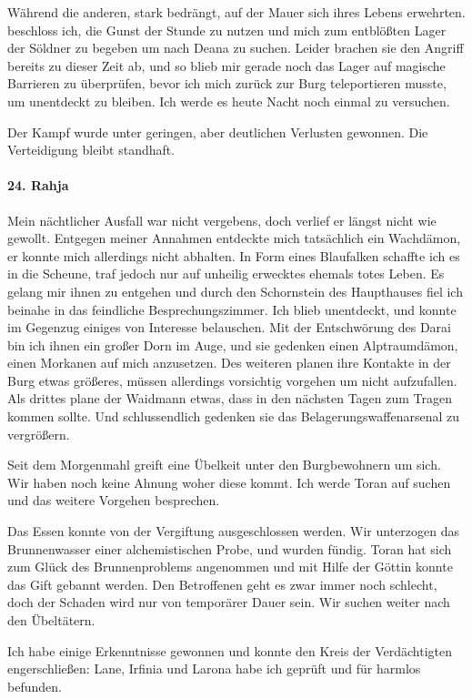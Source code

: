 Während die anderen, stark bedrängt, auf der Mauer sich ihres Lebens erwehrten. beschloss ich, die Gunst der Stunde zu nutzen und mich zum entblößten Lager der Söldner zu begeben um nach Deana zu suchen. Leider brachen sie den Angriff bereits zu dieser Zeit ab, und so blieb mir gerade noch das Lager auf magische Barrieren zu überprüfen, bevor ich mich zurück zur Burg teleportieren musste, um unentdeckt zu bleiben. Ich werde es heute Nacht noch einmal zu versuchen.

Der Kampf wurde unter geringen, aber deutlichen Verlusten gewonnen. Die Verteidigung bleibt standhaft.

\paragraph{24. Rahja}
Mein nächtlicher Ausfall war nicht vergebens, doch verlief er längst nicht wie gewollt. Entgegen meiner Annahmen entdeckte mich tatsächlich ein Wachdämon, er konnte mich allerdings nicht abhalten. In Form eines Blaufalken schaffte ich es in die Scheune, traf jedoch nur auf unheilig erwecktes ehemals totes Leben. Es gelang mir ihnen zu entgehen und durch den Schornstein des Haupthauses fiel ich beinahe in das feindliche Besprechungszimmer. Ich blieb unentdeckt, und konnte im Gegenzug einiges von Interesse belauschen. Mit der Entschwörung des Darai bin ich ihnen ein großer Dorn im Auge, und sie gedenken einen Alptraumdämon, einen Morkanen auf mich anzusetzen. Des weiteren planen ihre Kontakte in der Burg etwas größeres, müssen allerdings vorsichtig vorgehen um nicht aufzufallen. Als drittes plane der Waidmann etwas, dass in den nächsten Tagen zum Tragen kommen sollte. Und schlussendlich gedenken sie das Belagerungswaffenarsenal zu vergrößern.

Seit dem Morgenmahl greift eine Übelkeit unter den Burgbewohnern um sich. Wir haben noch keine Ahnung woher diese kommt. Ich werde Toran auf suchen und das weitere Vorgehen besprechen.

Das Essen konnte von der Vergiftung ausgeschlossen werden. Wir unterzogen das Brunnenwasser einer alchemistischen Probe, und wurden fündig. Toran hat sich zum Glück des Brunnenproblems angenommen und mit Hilfe der Göttin konnte das Gift gebannt werden. Den Betroffenen geht es zwar immer noch schlecht, doch der Schaden wird nur von temporärer Dauer sein. Wir suchen weiter nach den Übeltätern.

Ich habe einige Erkenntnisse gewonnen und konnte den Kreis der Verdächtigten engerschließen:
Lane, Irfinia und Larona habe ich geprüft und für harmlos befunden.

